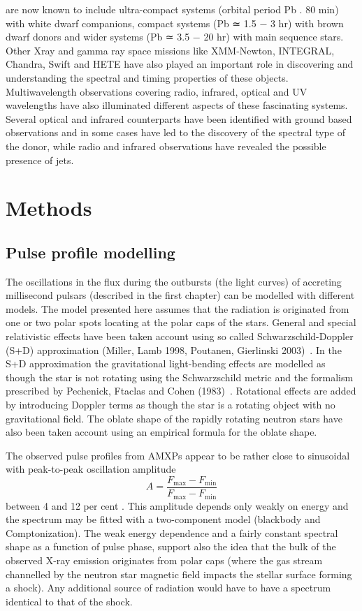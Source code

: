 \documentclass{wihuri}
\def\be{\begin{equation}}
\def\ee{\end{equation}}
\begin{document}
are now known to include ultra-compact systems (orbital period Pb . 80 min) with
white dwarf companions, compact systems (Pb ≃ 1.5 − 3 hr) with brown dwarf
donors and wider systems (Pb ≃ 3.5 − 20 hr) with main sequence stars. Other Xray
and gamma ray space missions like XMM-Newton, INTEGRAL, Chandra, Swift
and HETE have also played an important role in discovering and understanding the
spectral and timing properties of these objects. Multiwavelength observations covering
radio, infrared, optical and UV wavelengths have also illuminated different
aspects of these fascinating systems. Several optical and infrared counterparts have
been identified with ground based observations and in some cases have led to the
discovery of the spectral type of the donor, while radio and infrared observations
have revealed the possible presence of jets.

\fi

\section{Methods}

\subsection{Pulse profile modelling}

The oscillations in the flux during the outbursts (the light curves) of accreting millisecond pulsars (described in the first chapter) can be modelled with different models. The model presented here assumes that the radiation is originated from one or two polar spots locating at the polar caps of the stars. General and special relativistic effects have been taken account using so called Schwarzschild-Doppler (S+D) approximation (Miller, Lamb 1998, Poutanen, Gierlinski 2003)~\cite{poutagierlinskisax}. In the S+D approximation the gravitational light-bending effects are modelled as though the star is not rotating using the Schwarzschild metric and the formalism prescribed by
Pechenick, Ftaclas and Cohen (1983)~\cite{pechenick}. 
Rotational effects are added by introducing Doppler terms as though the star is a rotating object with no gravitational field. The oblate shape of the rapidly rotating neutron stars have also been taken account using an empirical formula for the oblate shape.

The observed pulse profiles from AMXPs appear to be rather close to sinusoidal with peak-to-peak oscillation amplitude 
\be \label{eq:amplitude}
A = \frac{F_{\mathrm{max}} - F_{\mathrm{min}}} {F_{\mathrm{max}} - F_{\mathrm{min}}}
\ee
 between 4 and 12 per cent \cite{poutarew2006}. This amplitude depends only weakly on energy and the spectrum may be fitted with a two-component model (blackbody and Comptonization). The weak energy dependence and a fairly constant spectral shape as a function of pulse phase, support also the idea that the bulk of the observed X-ray emission originates from polar caps (where the gas stream channelled by the neutron star magnetic field impacts the stellar surface forming a shock). Any additional source of radiation would have to have a spectrum identical to that of the shock.
\end{document}

